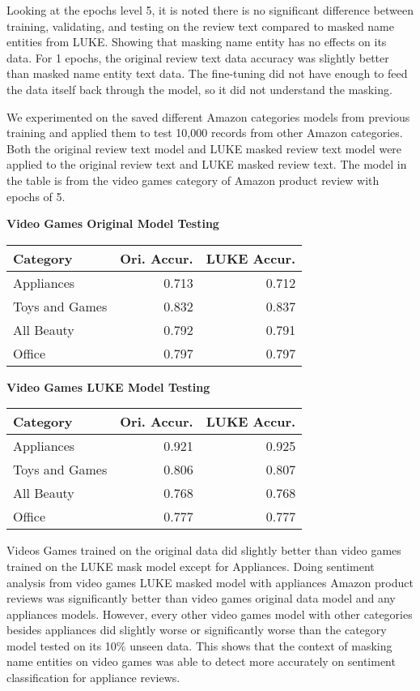 \documentclass[11pt,a4paper]{article}
\begin{document}
Looking at the epochs level 5, it is noted there is no significant difference between training, validating, and testing on the review text compared to masked name entities from LUKE. Showing that masking name entity has no effects on its data. For 1 epochs, the original review text data accuracy was slightly better than masked name entity text data. The fine-tuning did not have enough to feed the data itself back through the model, so it did not understand the masking.

We experimented on the saved different Amazon categories models from previous training and applied them to test 10,000 records from other Amazon categories. Both the original review text model and LUKE masked review text model were applied to the original review text and LUKE masked review text. The model in the table is from the video games category of Amazon product review with epochs of 5. \\

\begin{center}
\textbf{Video Games Original Model Testing}
\begin{tabular}{|l|r|r|}
  \hline
   Category & Ori. Accur. & LUKE Accur. \\
  \hline
  Appliances     & 0.713       & 0.712       \\
  Toys and Games & 0.832       & 0.837       \\
  All Beauty     & 0.792       & 0.791       \\
  Office         & 0.797       & 0.797       \\
  \hline
\end{tabular}
\end{center}

\begin{center}
\textbf{Video Games LUKE Model Testing}
\begin{tabular}{|l|r|r|}
  \hline
    Category & Ori. Accur. & LUKE Accur. \\
  \hline
  Appliances     & 0.921       & 0.925       \\
  Toys and Games & 0.806       & 0.807       \\
  All Beauty     & 0.768       & 0.768       \\
  Office         & 0.777       & 0.777       \\
  \hline
\end{tabular}
\end{center}

Videos Games trained on the original data did slightly better than video games trained on the LUKE mask model except for Appliances. Doing sentiment analysis from video games LUKE masked model with appliances Amazon product reviews was significantly better than video games original data model and any appliances models. However, every other video games model with other categories besides appliances did slightly worse or significantly worse than the category model tested on its 10\% unseen data. This shows that the context of masking name entities on video games was able to detect more accurately on sentiment classification for appliance reviews.
\end{document}

